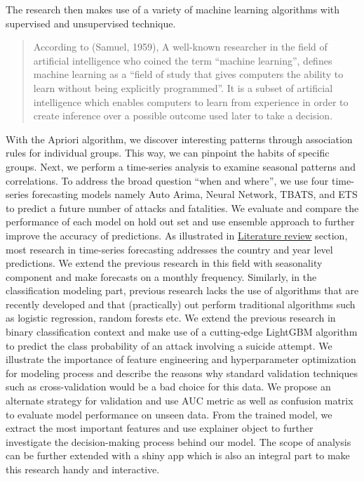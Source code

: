 \documentclass[11pt,oneside,a4paper]{reedthesis}
\begin{document}
The research then makes use of a variety of machine learning algorithms
with supervised and unsupervised technique.
\begin{quote}
According to (Samuel, 1959), A well-known researcher in the field of
artificial intelligence who coined the term ``machine learning'',
defines machine learning as a ``field of study that gives computers the
ability to learn without being explicitly programmed''. It is a subset
of artificial intelligence which enables computers to learn from
experience in order to create inference over a possible outcome used
later to take a decision.
\end{quote}
With the Apriori algorithm, we discover interesting patterns through
association rules for individual groups. This way, we can pinpoint the
habits of specific groups. Next, we perform a time-series analysis to
examine seasonal patterns and correlations. To address the broad
question ``when and where'', we use four time-series forecasting models
namely Auto Arima, Neural Network, TBATS, and ETS to predict a future
number of attacks and fatalities. We evaluate and compare the
performance of each model on hold out set and use ensemble approach to
further improve the accuracy of predictions. As illustrated in
\protect\hyperlink{literature-review}{Literature review} section, most
research in time-series forecasting addresses the country and year level
predictions. We extend the previous research in this field with
seasonality component and make forecasts on a monthly frequency.
Similarly, in the classification modeling part, previous research lacks
the use of algorithms that are recently developed and that (practically)
out perform traditional algorithms such as logistic regression, random
forests etc. We extend the previous research in binary classification
context and make use of a cutting-edge LightGBM algorithm to predict the
class probability of an attack involving a suicide attempt. We
illustrate the importance of feature engineering and hyperparameter
optimization for modeling process and describe the reasons why standard
validation techniques such as cross-validation would be a bad choice for
this data. We propose an alternate strategy for validation and use AUC
metric as well as confusion matrix to evaluate model performance on
unseen data. From the trained model, we extract the most important
features and use explainer object to further investigate the
decision-making process behind our model. The scope of analysis can be
further extended with a shiny app which is also an integral part to make
this research handy and interactive.
\end{document}
